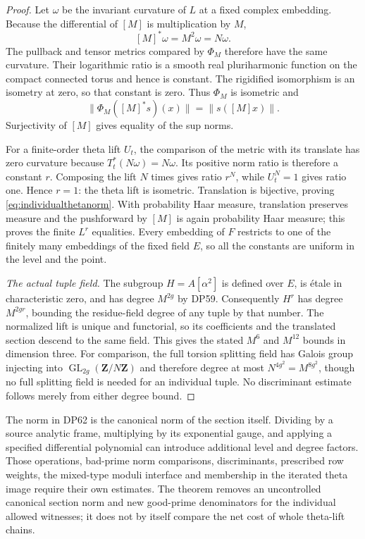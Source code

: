 \begin{proof}
Let $\omega$ be the invariant curvature of $L$ at a fixed complex embedding.
Because the differential of $[M]$ is multiplication by $M$,
\[
 [M]^*\omega=M^2\omega=N\omega.
\]
The pullback and tensor metrics compared by $\Phi_M$ therefore have the same curvature.
Their logarithmic ratio is a smooth real pluriharmonic function on the compact connected torus and hence is constant.
The rigidified isomorphism is an isometry at zero, so that constant is zero.
Thus $\Phi_M$ is isometric and
\[
 \|\Phi_M([M]^*s)(x)\|=\|s([M]x)\|.
\]
Surjectivity of $[M]$ gives equality of the sup norms.

For a finite-order theta lift $U_t$, the comparison of the metric with its translate has zero curvature because $T_t^*(N\omega)=N\omega$.
Its positive norm ratio is therefore a constant $r$.
Composing the lift $N$ times gives ratio $r^N$, while $U_t^N=1$ gives ratio one.
Hence $r=1$: the theta lift is isometric.
Translation is bijective, proving \eqref{eq:individualthetanorm}.
With probability Haar measure, translation preserves measure and the pushforward by $[M]$ is again probability Haar measure; this proves the finite $L^r$ equalities.
Every embedding of $F$ restricts to one of the finitely many embeddings of the fixed field $E$, so all the constants are uniform in the level and the point.

\emph{The actual tuple field.}
The subgroup $H=A[\alpha^2]$ is defined over $E$, is \'etale in characteristic zero, and has degree $M^{2g}$ by DP59.
Consequently $H^r$ has degree $M^{2gr}$, bounding the residue-field degree of any tuple by that number.
The normalized lift is unique and functorial, so its coefficients and the translated section descend to the same field.
This gives the stated $M^6$ and $M^{12}$ bounds in dimension three.
For comparison, the full torsion splitting field has Galois group injecting into $\operatorname{GL}_{2g}(\mathbf Z/N\mathbf Z)$ and therefore degree at most $N^{4g^2}=M^{8g^2}$, though no full splitting field is needed for an individual tuple.
No discriminant estimate follows merely from either degree bound.
\end{proof}

The norm in DP62 is the canonical norm of the section itself.
Dividing by a source analytic frame, multiplying by its exponential gauge, and applying a specified differential polynomial can introduce additional level and degree factors.
Those operations, bad-prime norm comparisons, discriminants, prescribed row weights, the mixed-type moduli interface and membership in the iterated theta image require their own estimates.
The theorem removes an uncontrolled canonical section norm and new good-prime denominators for the individual allowed witnesses; it does not by itself compare the net cost of whole theta-lift chains.
